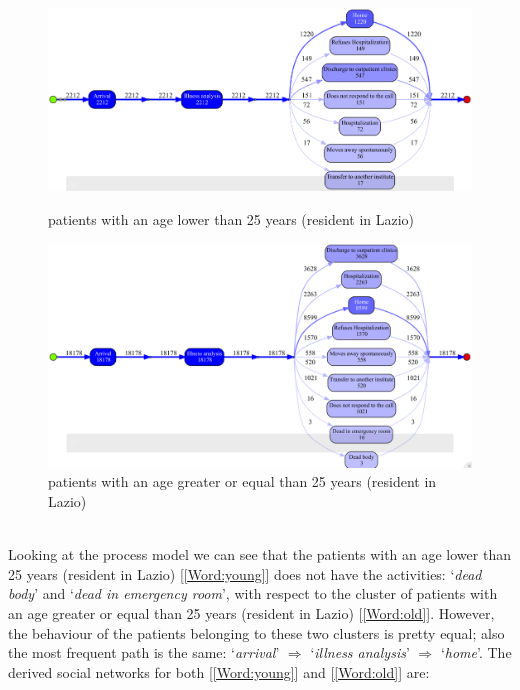 \begin{figure} [htbp]
\includegraphics[width=\textwidth, keepaspectratio]{ProntoSoccorsoInductiveVisualMinerYoungs}
\caption{patients with an age lower than 25 years (resident in Lazio)}
\includegraphics[width=\textwidth, keepaspectratio]{ProntoSoccorsoInductiveVisualMinerOlds}
\caption{patients with an age greater or equal than 25 years (resident in Lazio)}
\end{figure}\\
Looking at the process model we can see that the patients with an age lower than 25 years (resident in Lazio) [\ref{Word:young}] does not have the activities: `\textit{dead body}' and `\textit{dead in emergency room}', with respect to the cluster of patients with an age greater or equal than 25 years (resident in Lazio) [\ref{Word:old}]. However, the behaviour of the patients belonging to these two clusters is pretty equal; also the most frequent path is the same: `\textit{arrival}' $\Rightarrow$ `\textit{illness analysis}' $\Rightarrow$ `\textit{home}'. The derived social networks for both [\ref{Word:young}] and [\ref{Word:old}] are:
